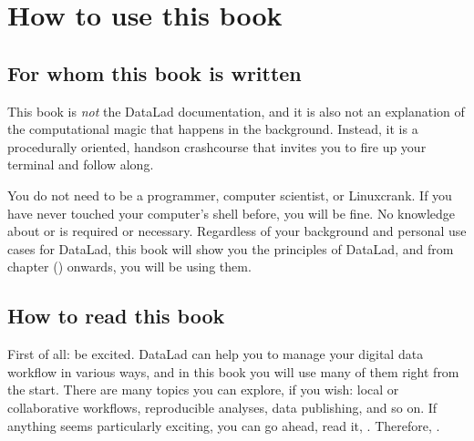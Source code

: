 \chapter{How to use this book}
\label{\detokenize{intro/narrative:how-to-use-this-book}}\label{\detokenize{intro/narrative::doc}}


\section{For whom this book is written}
\label{\detokenize{intro/narrative:for-whom-this-book-is-written}}
\sphinxAtStartPar
This book is \textit{not} the DataLad documentation, and it is also
not an explanation of the computational magic that happens in the background.
Instead, it is a procedurally oriented, hands\sphinxhyphen{}on crash\sphinxhyphen{}course that invites
you to fire up your terminal and follow along.

\sphinxAtStartPar
{}

\sphinxAtStartPar
You do not need to be a programmer, computer scientist, or Linux\sphinxhyphen{}crank.
If you have never touched your computer’s shell before, you will be fine.
No knowledge about {\hyperref[\detokenize{glossary:term-Git}]{}} or {\hyperref[\detokenize{glossary:term-git-annex}]{}} is required or necessary.
Regardless of your background and personal use cases for DataLad, this
book will show you the principles of DataLad, and from chapter {\hyperref[\detokenize{basics/101-101-create:createds}]{}} () onwards,
you will be using them.


\section{How to read this book}
\label{\detokenize{intro/narrative:how-to-read-this-book}}
\sphinxAtStartPar
First of all: be excited. DataLad can help you to manage your digital data
workflow in various ways, and in this book you will use many of them right
from the start.
There are many topics you can explore, if you wish:
local or collaborative workflows, reproducible analyses, data publishing, and so on.
If anything seems particularly exciting, you can go ahead, read it, .
Therefore, .

